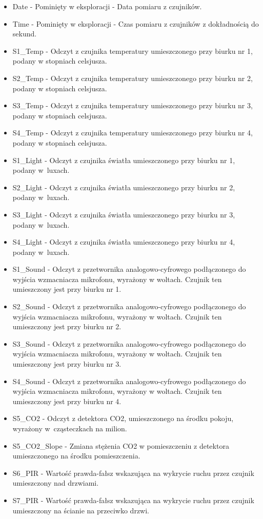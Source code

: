 \documentclass[12pt,oneside,a4paper]{book} %
\theoremstyle{break}
\begin{document}
\begin{itemize}
  \item Date - Pominięty w eksploracji - Data pomiaru z czujników.
  \item Time - Pominięty w eksploracji - Czas pomiaru z czujników z dokładnością do sekund.
  \item S1\_Temp - Odczyt z czujnika temperatury umieszczonego przy biurku nr 1, podany w stopniach celsjusza.
  \item S2\_Temp - Odczyt z czujnika temperatury umieszczonego przy biurku nr 2, podany w stopniach celsjusza.
  \item S3\_Temp - Odczyt z czujnika temperatury umieszczonego przy biurku nr 3, podany w stopniach celsjusza.
  \item S4\_Temp - Odczyt z czujnika temperatury umieszczonego przy biurku nr 4, podany w stopniach celsjusza.
  \item S1\_Light - Odczyt z czujnika światła umieszczonego przy biurku nr 1, podany w~luxach.
  \item S2\_Light - Odczyt z czujnika światła umieszczonego przy biurku nr 2, podany w~luxach.
  \item S3\_Light - Odczyt z czujnika światła umieszczonego przy biurku nr 3, podany w~luxach.
  \item S4\_Light - Odczyt z czujnika światła umieszczonego przy biurku nr 4, podany w~luxach.
  \item S1\_Sound - Odczyt z przetwornika analogowo-cyfrowego podłączonego do wyjścia wzmacniacza mikrofonu, wyrażony w woltach. Czujnik ten umieszczony jest przy biurku nr 1.
  \item S2\_Sound - Odczyt z przetwornika analogowo-cyfrowego podłączonego do wyjścia wzmacniacza mikrofonu, wyrażony w woltach. Czujnik ten umieszczony jest przy biurku nr 2.
  \item S3\_Sound - Odczyt z przetwornika analogowo-cyfrowego podłączonego do wyjścia wzmacniacza mikrofonu, wyrażony w woltach. Czujnik ten umieszczony jest przy biurku nr 3.
  \item S4\_Sound - Odczyt z przetwornika analogowo-cyfrowego podłączonego do wyjścia wzmacniacza mikrofonu, wyrażony w woltach. Czujnik ten umieszczony jest przy biurku nr 4.
  \item S5\_CO2 - Odczyt z detektora CO2, umieszczonego na środku pokoju, wyrażony w~cząsteczkach na milion.
  \item S5\_CO2\_Slope - Zmiana stężenia CO2 w pomieszczeniu z detektora umieszczonego na środku pomieszczenia.
  \item S6\_PIR - Wartość prawda-fałsz wskazująca na wykrycie ruchu przez czujnik umieszczony nad drzwiami.
  \item S7\_PIR - Wartość prawda-fałsz wskazująca na wykrycie ruchu przez czujnik umieszczony na ścianie na przeciwko drzwi.
\end{itemize}
\end{document}
